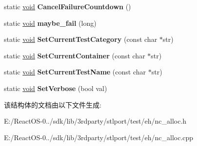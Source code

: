 \begin{DoxyCompactItemize}
\item 
\mbox{\label{struct_test_controller_a53308426061991e32c17fa484e91bfbf}} 
static \hyperlink{interfacevoid}{void} {\bfseries Cancel\+Failure\+Countdown} ()
\item 
\mbox{\label{struct_test_controller_ae3e99ef51d6d9322e8f56558714484c8}} 
static \hyperlink{interfacevoid}{void} {\bfseries maybe\+\_\+fail} (long)
\item 
\mbox{\label{struct_test_controller_af80d6fbf2e054f4d704a07ac81af4c43}} 
static \hyperlink{interfacevoid}{void} {\bfseries Set\+Current\+Test\+Category} (const char $\ast$str)
\item 
\mbox{\label{struct_test_controller_af022c0bf034e67fae65ace386f50f7a3}} 
static \hyperlink{interfacevoid}{void} {\bfseries Set\+Current\+Container} (const char $\ast$str)
\item 
\mbox{\label{struct_test_controller_a251a3e0638c51e44c437979315c62c3b}} 
static \hyperlink{interfacevoid}{void} {\bfseries Set\+Current\+Test\+Name} (const char $\ast$str)
\item 
\mbox{\label{struct_test_controller_a8c2440ed1bb98f87b55168db1dc73073}} 
static \hyperlink{interfacevoid}{void} {\bfseries Set\+Verbose} (bool val)
\end{DoxyCompactItemize}


该结构体的文档由以下文件生成\+:\begin{DoxyCompactItemize}
\item 
E\+:/\+React\+O\+S-\/0../sdk/lib/3rdparty/stlport/test/eh/nc\+\_\+alloc.\+h\item 
E\+:/\+React\+O\+S-\/0../sdk/lib/3rdparty/stlport/test/eh/nc\+\_\+alloc.\+cpp\end{DoxyCompactItemize}
